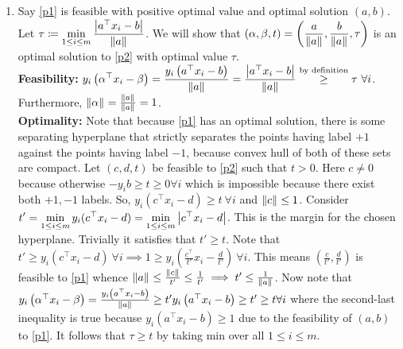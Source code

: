 \begin{enumerate}[leftmargin=*]
\item Say \ref{p1} is feasible with positive optimal value and optimal solution $(a,b)$. Let $\displaystyle\tau \coloneqq \min\limits_{1\le i\le m}\frac{\left| a^{\top}x_{i}-b \right|}{\left\lVert a \right\rVert_{}}$. We will show that $\displaystyle(\alpha,\beta,t) = \left(\frac{a}{\left\lVert a \right\rVert_{}}, \frac{b}{\left\lVert a \right\rVert_{}}, \tau\right)$ is an optimal solution to \ref{p2} with optimal value $\tau$. \\
\textbf{Feasibility:} $\displaystyle y_{i}\left(\alpha^{\top}x_{i}-\beta\right) = \frac{y_{i}\left(a^{\top}x_{i}-b\right)}{\left\lVert a \right\rVert_{}} = \frac{\left|a^{\top}x_{i}-b\right|}{\left\lVert a \right\rVert_{}}\stackrel{\text{by definition}}{\ge} \tau~\forall i$. Furthermore, $\left\lVert \alpha \right\rVert_{} = \frac{\left\lVert a \right\rVert_{}}{\left\lVert a \right\rVert_{}} = 1$. \\
\textbf{Optimality:} Note that because \ref{p1} has an optimal solution, there is some separating hyperplane that strictly separates the points having label $+1$ against the points having label $-1$, because convex hull of both of these sets are compact. Let $(c,d,t)$ be feasible to \ref{p2} such that $t > 0$. Here $c\ne 0$ because otherwise $-y_{i}b\ge t\ge 0\forall i$ which is impossible because there exist both $+1,-1$ labels. So, $y_{i}(c^{\top}x_{i}-d) \ge t ~\forall i$ and $\left\lVert c \right\rVert_{} \le 1$. Consider $\displaystyle t' = \min_{1\le i\le m} y_{i}(c^{\top} x_{i}-d) = \min_{1\le i\le m} \left| c^{\top} x_{i}-d \right|$. This is the margin for the chosen hyperplane. Trivially it satisfies that $t' \ge t$. Note that $t'\ge y_{i}(c^{\top} x_{i}-d) ~\forall i\implies 1\ge y_{i} \left(\frac{c^{\top}}{t'} x_{i}-\frac{d}{t'}\right)~\forall i$. This means $\left(\frac{c}{t'},\frac{d}{t'}\right)$ is feasible to \ref{p1} whence $\left\lVert a \right\rVert_{} \le \frac{\left\lVert c \right\rVert_{}}{t'} \le \frac{1}{t'}\implies t'\le \frac{1}{\left\lVert a \right\rVert_{}}$. Now note that $y_{i}\left(\alpha^{\top}x_{i}-\beta\right) = \frac{y_{i}\left(a^{\top}x_{i}-b\right)}{\left\lVert a \right\rVert_{}} \ge t' y_{i}\left(a^{\top}x_{i}-b\right) \ge t' \ge t \forall i$ where the second-last inequality is true because $y_{i}\left(a^{\top}x_{i}-b\right)\ge 1$ due to the feasibility of $(a,b)$ to \ref{p1}. It follows that $\tau \ge t$ by taking min over all $1\le i\le m$. 
\\



\end{enumerate}

